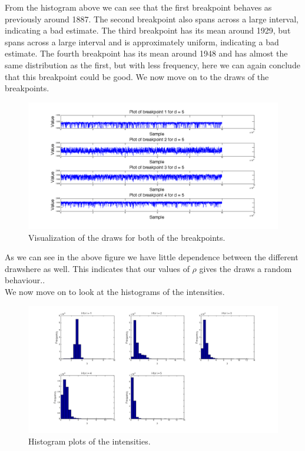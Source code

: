 From the histogram above we can see that the first breakpoint behaves as previously around 1887. The second breakpoint also spans across a large interval, indicating a bad estimate. The third breakpoint has its mean around 1929, but spans across a large interval and is approximately uniform, indicating a bad estimate. The fourth breakpoint has its mean around 1948 and has almost the same distribution as the first, but with less frequency, here we can again conclude that this breakpoint could be good. We now move on to the draws of the breakpoints.

\begin{figure}[H]
\centering
\includegraphics[scale=0.26]{./Figures/t4.png}
\caption{Visualization of the draws for both of the breakpoints.}
\label{fig:t4}
\end{figure}


As we can see in the above figure we have little dependence between the different drawshere as well. This indicates that our values of $\rho$ gives the draws a random behaviour.. \\ We now move on to look at the histograms of the intensities.

\begin{figure}[H]
\centering
\includegraphics[scale=0.26]{./Figures/lpost4.png}
\caption{Histogram plots of the intensities.}
\label{fig:lpost4}
\end{figure}

